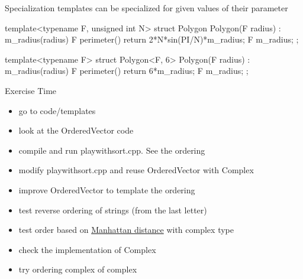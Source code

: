\begin{frame}[fragile]
  \begin{block}{Specialization}
    templates can be specialized for given values of their parameter
  \end{block}
  \begin{cppcode*}{}
    template<typename F, unsigned int N> struct Polygon {
      Polygon(F radius) : m_radius(radius) {}
      F perimeter() {return 2*N*sin(PI/N)*m_radius;}
      F m_radius;
    };

    template<typename F>
    struct Polygon<F, 6> {
      Polygon(F radius) : m_radius(radius) {}
      F perimeter() {return 6*m_radius;}
      F m_radius;
    };
  \end{cppcode*}
\end{frame}

\begin{frame}[fragile]
  \begin{alertblock}{Exercise Time}
    \begin{itemize}
    \item go to code/templates
    \item look at the OrderedVector code
    \item compile and run playwithsort.cpp. See the ordering
    \item modify playwithsort.cpp and reuse OrderedVector with Complex
    \item improve OrderedVector to template the ordering
    \item test reverse ordering of strings (from the last letter)
    \item test order based on {\color{blue} \href{https://en.wikipedia.org/wiki/Taxicab_geometry}{Manhattan distance}} with complex type
    \item check the implementation of Complex
    \item try ordering complex of complex
    \end{itemize}
  \end{alertblock}
\end{frame}
